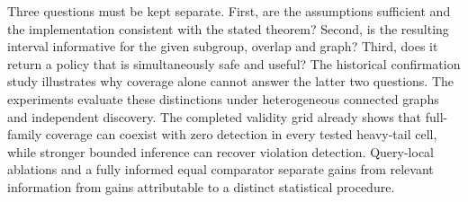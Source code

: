 Three questions must be kept separate. First, are the assumptions sufficient
and the implementation consistent with the stated theorem? Second, is the
resulting interval informative for the given subgroup, overlap and graph?
Third, does it return a policy that is simultaneously safe and useful?
The historical confirmation study illustrates why coverage alone cannot answer
the latter two questions. The experiments evaluate these distinctions under
heterogeneous connected graphs and independent discovery. The completed
validity grid already shows that full-family coverage can coexist with zero
detection in every tested heavy-tail cell, while stronger bounded inference
can recover violation detection. Query-local ablations and a fully informed
equal comparator separate gains from relevant information from gains
attributable to a distinct statistical procedure.
